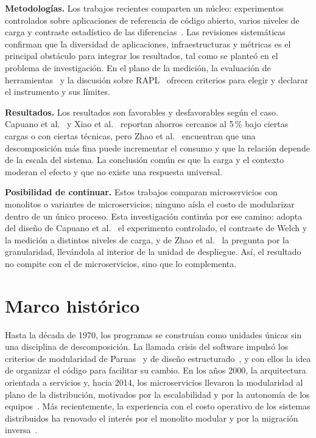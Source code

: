 \textbf{Metodologías.} Los trabajos recientes comparten un núcleo: experimentos controlados sobre aplicaciones de referencia de código abierto, varios niveles de carga y contraste estadístico de las diferencias~\cite{capuano2026comparative,zhao2025granularity,xiao2025tactics}. Las revisiones sistemáticas~\cite{araujo2024energy,su2024microservice} confirman que la diversidad de aplicaciones, infraestructuras y métricas es el principal obstáculo para integrar los resultados, tal como se planteó en el problema de investigación. En el plano de la medición, la evaluación de herramientas~\cite{centofanti2024power} y la discusión sobre RAPL~\cite{khan2018rapl} ofrecen criterios para elegir y declarar el instrumento y sus límites.

\textbf{Resultados.} Los resultados son favorables y desfavorables según el caso. Capuano et al.~\cite{capuano2026comparative} y Xiao et al.~\cite{xiao2025tactics} reportan ahorros cercanos al 5\,\% bajo ciertas cargas o con ciertas técnicas, pero Zhao et al.~\cite{zhao2025granularity} encuentran que una descomposición más fina puede incrementar el consumo y que la relación depende de la escala del sistema. La conclusión común es que la carga y el contexto moderan el efecto y que no existe una respuesta universal.

\textbf{Posibilidad de continuar.} Estos trabajos comparan microservicios con monolitos o variantes de microservicios; ninguno aísla el costo de modularizar dentro de un único proceso. Esta investigación continúa por ese camino: adopta del diseño de Capuano et al.~\cite{capuano2026comparative} el experimento controlado, el contraste de Welch y la medición a distintos niveles de carga, y de Zhao et al.~\cite{zhao2025granularity} la pregunta por la granularidad, llevándola al interior de la unidad de despliegue. Así, el resultado no compite con el de microservicios, sino que lo complementa.

\section{Marco histórico}
\label{sec:marco-historico}

Hasta la década de 1970, los programas se construían como unidades únicas sin una disciplina de descomposición. La llamada crisis del software impulsó los criterios de modularidad de Parnas~\cite{parnas1972criteria} y de diseño estructurado~\cite{stevens1974structured}, y con ellos la idea de organizar el código para facilitar su cambio. En los años 2000, la arquitectura orientada a servicios y, hacia 2014, los microservicios llevaron la modularidad al plano de la distribución, motivados por la escalabilidad y por la autonomía de los equipos~\cite{aldebagy2018comparative,newman2021microservices}. Más recientemente, la experiencia con el costo operativo de los sistemas distribuidos ha renovado el interés por el monolito modular y por la migración inversa~\cite{su2024microservice}.

